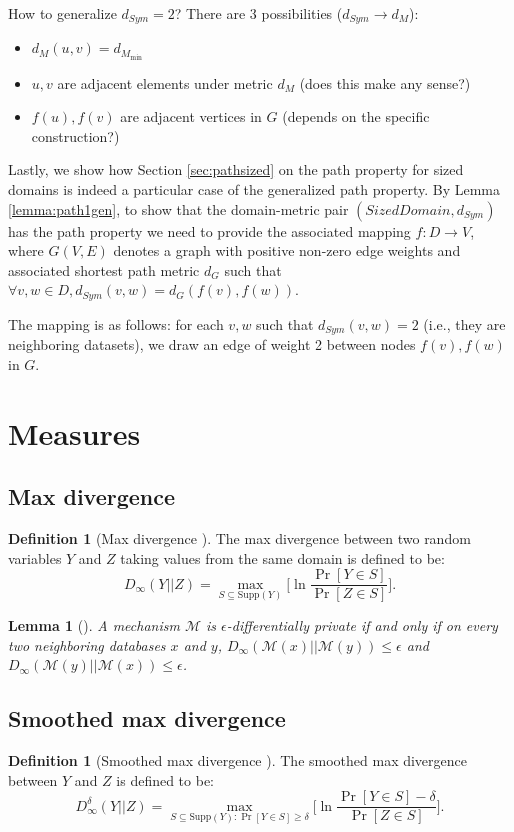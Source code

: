 \documentclass[11pt,a4paper]{article}
\newtheorem{lemma}[theorem]{Lemma}
\theoremstyle{definition}
\newtheorem{definition}[theorem]{Definition}
\newcommand{\M}{\mathcal{M}}
\begin{document}
How to generalize $d_{Sym} = 2$? There are 3 possibilities ($d_{Sym} \rightarrow d_M$):
\begin{itemize}
    \item $d_M(u, v) = d_{M_{\min}}$
    \item $u,v$ are adjacent elements under metric $d_M$ (does this make any sense?)
    \item $f(u), f(v)$ are adjacent vertices in $G$ (depends on the specific construction?)
\end{itemize}

Lastly, we show how Section \ref{sec:pathsized} on the path property for sized domains is indeed a particular case of the generalized path property. By Lemma \ref{lemma:path1gen}, to show that the domain-metric pair $(SizedDomain, d_{Sym})$ has the path property we need to provide the associated mapping $f: D \rightarrow V$, where $G(V, E)$ denotes a graph with positive non-zero edge weights and associated shortest path metric $d_G$ such that $\forall v, w \in D, d_{Sym}(v, w) = d_G(f(v), f(w))$. 

The mapping is as follows: for each $v, w$ such that $d_{Sym}(v, w) = 2$ (i.e., they are neighboring datasets), we draw an edge of weight 2 between nodes $f(v), f(w)$ in $G$. 

\section{Measures}
\subsection{Max divergence}
\begin{definition}[Max divergence \cite{dr14}]
    The max divergence between two random variables $Y$ and $Z$ taking values from the same domain is defined to be:
    \[
        D_{\infty}(Y||Z) = \max_{S \subseteq \textrm{Supp}(Y)} \Big[\ln \dfrac{\Pr[Y \in S]}{\Pr[Z \in S]} \Big].
    \]
\end{definition}

\begin{lemma}[\cite{dr14}]
    A mechanism $\M$ is $\epsilon$-differentially private if and only if on every two neighboring databases $x$ and $y$, $D_{\infty}(\M(x)||\M(y)) \leq \epsilon$ and $D_{\infty}(\M(y)||\M(x)) \leq \epsilon$.
\end{lemma}

\subsection{Smoothed max divergence}
\begin{definition}[Smoothed max divergence \cite{dr14}]
    The smoothed max divergence between $Y$ and $Z$ is defined to be:
    \[
        D^{\delta}_{\infty}(Y||Z) = \max_{S \subseteq \textrm{Supp}(Y): \Pr[Y \in S] \geq \delta} \Big[\ln \dfrac{\Pr[Y \in S]-\delta}{\Pr[Z \in S]} \Big].
    \]
\end{definition}
\end{document}
